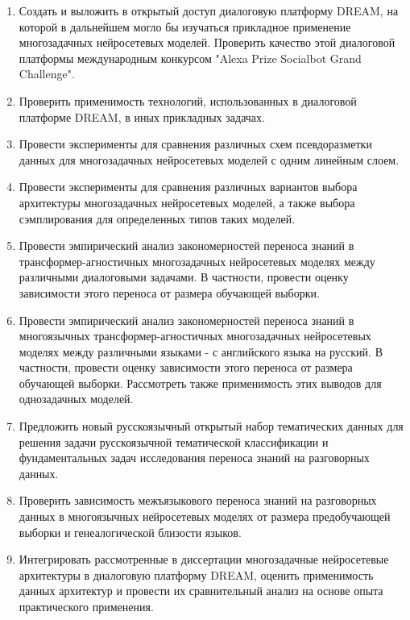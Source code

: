 \begin{enumerate}
  \item {Создать и выложить в открытый доступ диалоговую платформу DREAM, на которой в дальнейшем могло бы изучаться прикладное применение многозадачных нейросетевых моделей. Проверить качество этой диалоговой платформы международным конкурсом "Alexa Prize Socialbot Grand Challenge". }
  \item {Проверить применимость технологий, использованных в диалоговой платформе DREAM, в иных прикладных задачах.}
  \item {Провести эксперименты для сравнения различных схем псевдоразметки данных для многозадачных нейросетевых моделей с одним линейным слоем.}
  \item {Провести эксперименты для сравнения различных вариантов выбора архитектуры многозадачных нейросетевых моделей, а также выбора сэмплирования для определенных типов таких моделей.}
  \item {Провести эмпирический анализ закономерностей переноса знаний в трансформер-агностичных многозадачных нейросетевых моделях между различными диалоговыми задачами. В частности, провести оценку зависимости этого переноса от размера обучающей выборки.}
  \item {Провести эмпирический анализ закономерностей переноса знаний в многоязычных трансформер-агностичных многозадачных нейросетевых моделях между различными языками - с английского языка на русский. В частности, провести оценку зависимости этого переноса от размера обучающей выборки. Рассмотреть также применимость этих выводов для однозадачных моделей.}
  \item {Предложить новый русскоязычный открытый набор тематических данных для решения задачи русскоязычной тематической классификации и фундаментальных задач исследования переноса знаний на разговорных данных.}
  \item {Проверить зависимость межъязыкового переноса знаний на разговорных данных в многоязычных нейросетевых моделях от размера предобучающей выборки и генеалогической близости языков.}
  \item {Интегрировать рассмотренные в диссертации многозадачные нейросетевые архитектуры в диалоговую платформу DREAM, оценить применимость данных архитектур и провести их сравнительный анализ на основе опыта практического применения.}
  \newline
  \newline
\end{enumerate}



